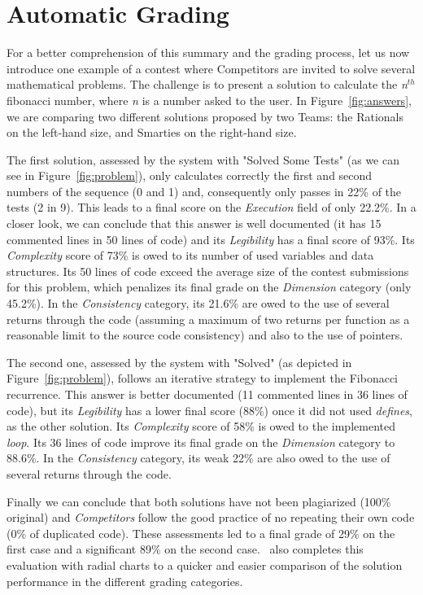 \section{Automatic Grading}\label{s:grading}

For a better comprehension of this summary and the grading process, let us now introduce one example of a contest where \textsf{Competitors} are invited to solve several mathematical problems. %
The challenge is to present a solution to calculate the \emph{n$^{th}$} fibonacci number, where \emph{n} is a number asked to the user.
In Figure~\ref{fig:answers}, we are comparing two different solutions proposed by two \textsf{Teams}: the \textsf{Rationals} on the left-hand size, and \textsf{Smarties} on the right-hand size.

The first solution, assessed by the system with "Solved Some Tests" (as we can see in Figure~\ref{fig:problem}), only calculates correctly the first and second numbers of the sequence (0 and 1) and, consequently only passes in 22\% of the tests (2 in 9).
This leads to a final score on the \emph{Execution} field of only 22.2\%. 
In a closer look, we can conclude that this answer is well documented (it has 15 commented lines in 50 lines of code) and its \emph{Legibility} has a final score of 93\%.
Its \emph{Complexity} score of 73\% is owed to its number of used variables and data structures.
Its 50 lines of code exceed the average size of the contest submissions for this problem, which penalizes its final grade on the \emph{Dimension} category (only 45.2\%).
In the \emph{Consistency} category, its 21.6\% are owed to the use of several returns through the code (assuming a maximum of two returns per function as a reasonable limit to the source code consistency) and also to the use of pointers.

The second one, assessed by the system with "Solved" (as depicted in Figure~\ref{fig:problem}), follows an iterative strategy to implement the Fibonacci recurrence. 
This answer is better documented (11 commented lines in 36 lines of code), but its \emph{Legibility} has a lower final score (88\%) once it did not used \emph{defines}, as the other solution.
Its \emph{Complexity} score of 58\% is owed to the implemented \emph{loop}.
Its 36 lines of code improve its final grade on the \emph{Dimension} category to 88.6\%.
In the \emph{Consistency} category, its weak 22\% are also owed to the use of several returns through the code.

Finally we can conclude that both solutions have not been plagiarized (100\% original) and \emph{Competitors} follow the good practice of no repeating their own code (0\% of duplicated code).
These assessments led to a final grade of 29\% on the first case and a significant 89\% on the second case.
\quim\ also completes this evaluation with radial charts to a quicker and easier comparison of the solution performance in the different grading categories.
